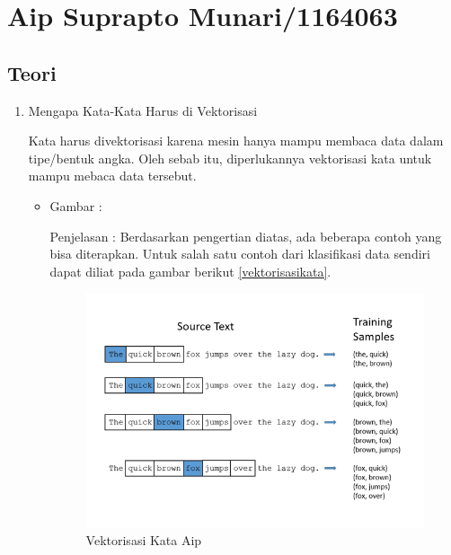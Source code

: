 \section{Aip Suprapto Munari/1164063}
\subsection{Teori}
\begin{enumerate}

\item Mengapa Kata-Kata Harus di Vektorisasi
\par Kata harus divektorisasi karena mesin hanya mampu membaca data dalam tipe/bentuk angka. Oleh sebab itu, diperlukannya vektorisasi kata untuk mampu mebaca data tersebut. 
\par
\begin{itemize}
\item Gambar :
\par Penjelasan : Berdasarkan pengertian diatas, ada beberapa contoh yang bisa diterapkan. Untuk salah satu contoh dari klasifikasi data sendiri dapat diliat pada gambar berikut \ref{vektorisasikata}.
\begin{figure}[!hbtp]
\centering
\includegraphics[scale=0.6]{figures/AIP/d1.PNG}
\caption{Vektorisasi Kata Aip}
\label{text-Aip}
\end{figure}
\end{itemize}


\end{enumerate}
